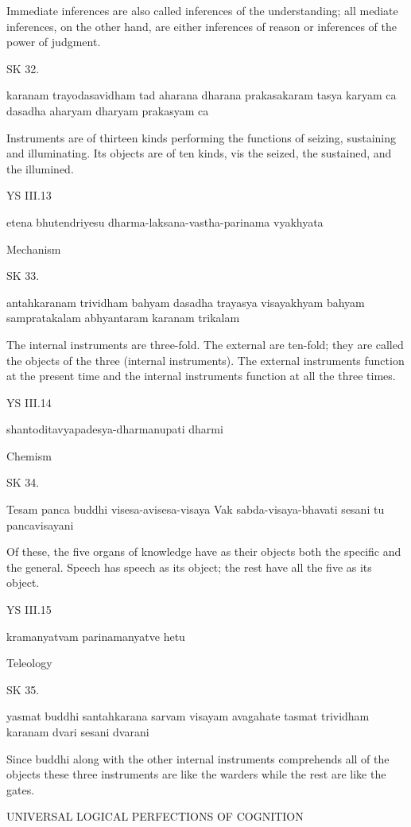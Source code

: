         Immediate inferences are also called inferences of the understanding;
        all mediate inferences, on the other hand, are either
        inferences of reason or
        inferences of the power of judgment.

SK 32.

karanam trayodasavidham tad aharana dharana prakasakaram
tasya karyam ca dasadha aharyam dharyam prakasyam ca

Instruments are of thirteen kinds performing the functions of
seizing, sustaining and illuminating.
Its objects are of ten kinds, vis
the seized, the sustained, and the illumined.

YS III.13

    etena bhutendriyesu dharma-laksana-vastha-parinama vyakhyata

    Mechanism

SK 33.

antahkaranam trividham bahyam dasadha trayasya visayakhyam
bahyam sampratakalam abhyantaram karanam trikalam

The internal instruments are three-fold.
The external are ten-fold; they are called the objects of the three (internal instruments).
The external instruments function at the present time and
the internal instruments function at all the three times.

YS III.14

    shantoditavyapadesya-dharmanupati dharmi

    Chemism

SK 34.

Tesam panca buddhi visesa-avisesa-visaya
Vak sabda-visaya-bhavati sesani tu pancavisayani

Of these, the five organs of knowledge have as their objects
both the specific and the general.
Speech has speech as its object;
the rest have all the five as its object.

YS III.15

    kramanyatvam parinamanyatve hetu

    Teleology

SK 35.

yasmat buddhi santahkarana sarvam visayam avagahate
tasmat trividham karanam dvari sesani dvarani

Since buddhi along with the other internal instruments
comprehends all of the objects these three instruments are
like the warders while the rest are like the gates.

UNIVERSAL LOGICAL PERFECTIONS OF COGNITION

